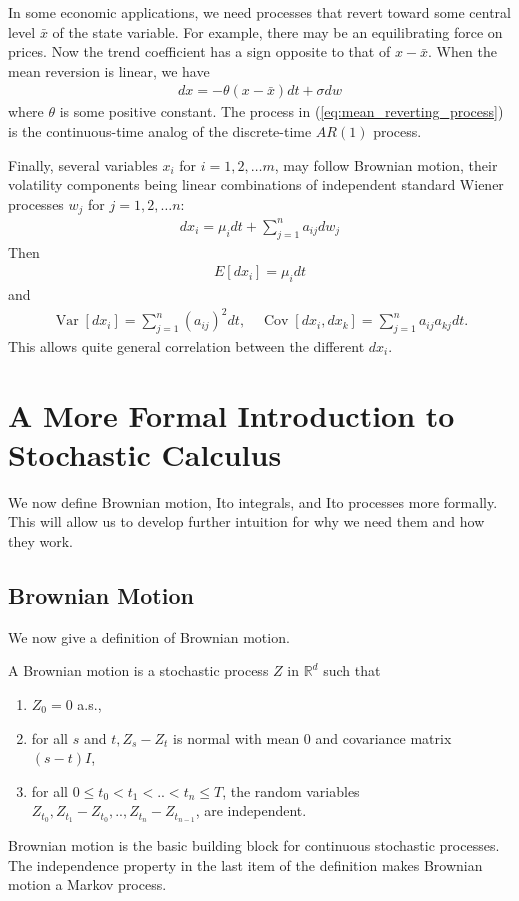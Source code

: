 \documentclass[\topdir/lecture\_notes.tex]{subfiles}
\begin{document}
In some economic applications, we need processes that revert toward some central level \(\bar{x}\) of the state variable. For example, there may be an equilibrating force on prices. Now the trend coefficient has a sign opposite to that of \(x-\bar{x}\). When the mean reversion is linear, we have
\begin{align}
dx=-\theta(x-\bar{x}) dt+\sigma dw \label{eq:mean_reverting_process}
\end{align}
where \(\theta\) is some positive constant. The process in (\ref{eq:mean_reverting_process}) is the continuous-time analog of the discrete-time \(AR(1)\) process.

Finally, several variables \(x_{i}\) for \(i=1,2, \ldots m\), may follow Brownian motion, their volatility components being linear combinations of independent standard Wiener processes \(w_{j}\) for \(j=1,2, \ldots n\):
\begin{align*}
dx_{i}=\mu_{i} dt+\sum_{j=1}^{n} a_{i j} dw_{j}
\end{align*}
Then
\begin{align*}
E\left[dx_{i}\right]=\mu_{i} dt
\end{align*}
and
\begin{align*}
\operatorname{Var}\left[dx_{i}\right]=\sum_{j=1}^{n}\left(a_{i j}\right)^{2} dt, \quad \operatorname{Cov}\left[dx_{i}, dx_{k}\right]=\sum_{j=1}^{n} a_{i j} a_{k j} dt.
\end{align*}
This allows quite general correlation between the different \(dx_{i}\).


\section{A More Formal Introduction to Stochastic Calculus}
We now define Brownian motion, Ito integrals, and Ito processes more formally. This will allow us to develop further intuition for why we need them and how they work.

\subsection{Brownian Motion}
We now give a definition of Brownian motion.

\begin{defn}\label{defn:brownian_motion}
A Brownian motion is a stochastic process \(Z\) in \(\mathbb{R}^{d}\) such that
\begin{enumerate}
  \item \(Z_{0}=0\) a.s.,

  \item for all \(s\) and \(t, Z_{s}-Z_{t}\) is normal with mean 0 and covariance matrix \((s-t) I\),

  \item for all \(0 \leq t_{0}<t_{1}<. .<t_{n} \leq T\), the random variables \(Z_{t_{0}}, Z_{t_{1}}-Z_{t_{0}}, . ., Z_{t_{n}}-Z_{t_{n-1}}\), are independent.
\end{enumerate}
\end{defn}
Brownian motion is the basic building block for continuous stochastic processes. The independence property in the last item of the definition makes Brownian motion a Markov process.
\end{document}
